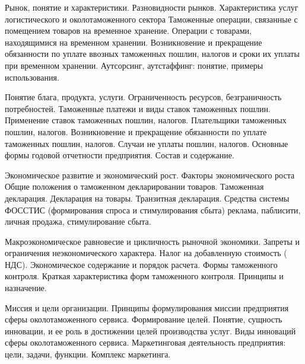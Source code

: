 \documentclass[
	11pt,
	a4paper,
	]
	{article}
\begin{document}
\bigskip

\noindent{} 
	{
		Рынок, понятие и характеристики. Разновидности рынков. Характеристика услуг логистического и околотаможенного сектора
	}{
		Таможенные операции, связанные с помещением товаров на временное хранение. Операции с товарами, находящимися на временном хранении. Возникновение и прекращение обязанности по уплате ввозных таможенных пошлин, налогов и сроки их уплаты при временном хранении.
	}{
		Аутсорсинг, аутстаффинг: понятие, примеры использования.
	}

\bigskip

\noindent{} 
	{
		Понятие блага, продукта, услуги. Ограниченность ресурсов, безграничность потребностей.
	}{
		Таможенные платежи и виды ставок таможенных пошлин. Применение ставок таможенных пошлин, налогов. Плательщики таможенных пошлин, налогов. Возникновение и прекращение обязанности по уплате таможенных пошлин, налогов. Случаи не уплаты пошлин, налогов.
	}{
		Основные формы годовой отчетности предприятия. Состав и содержание.
	}

\bigskip

\noindent{} 
	{
		Экономическое развитие и экономический рост. Факторы экономического роста
	}{
		Общие положения о таможенном декларировании товаров. Таможенная декларация. Декларация на товары. Транзитная декларация.
	}{
		Средства системы ФОССТИС (формирования спроса и стимулирования сбыта) реклама, паблисити, личная продажа, стимулирование сбыта.
	}

\bigskip

\noindent{} 
	{
		Макроэкономическое равновесие и цикличность рыночной экономики. Запреты и ограничения неэкономического характера.
	}{
		Налог на добавленную стоимость ( НДС). Экономическое содержание и порядок расчета.
	}{
		Формы таможенного контроля. Краткая характеристика форм таможенного контроля. Принципы и назначение.
	}

\bigskip

\noindent{} 
	{
		Миссия и цели организации. Принципы формулирования миссии предприятия сферы околотаможенного сервиса. Формирование целей.
	}{
		Понятие, сущность инновации, и ее роль в достижении целей производства услуг. Виды инноваций сферы околотаможенного сервиса.
	}{
		Маркетинговая деятельность предприятия: цели, задачи, функции. Комплекс маркетинга.
	}

\bigskip
\end{document}
